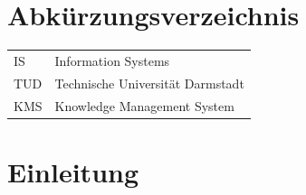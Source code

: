 \documentclass[
	english,
	ruledheaders=section,%
	class=report,%
	thesis={type=bachelor},%
	accentcolor=1b,%
	custommargins=true,%
	marginpar=false,%
	parskip=half-,%
	fontsize=11pt,%
	DIV=14,
]{tudapub}
\begin{document}
\listoffigures
{}           %

\listoftables
{}           %

\chapter*{Abkürzungsverzeichnis}

\begin{xtabular}{ll}
IS					&	Information Systems\\
TUD					&	Technische Universität Darmstadt\\
KMS                 &   Knowledge Management System \\

\end{xtabular} 


\onehalfspacing
\chapter{Einleitung}
\setcounter{seitenzahlroemisch}{\value{page}}
\end{document}
